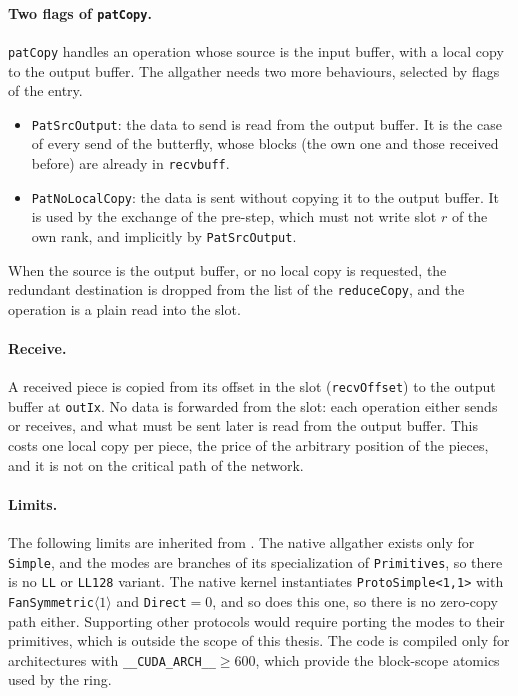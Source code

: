 \paragraph{Two flags of \texttt{patCopy}.}
\texttt{patCopy} handles an operation whose source is the input buffer, with a local copy to the output buffer.
The \bine{} allgather needs two more behaviours, selected by flags of the entry.
\begin{itemize}
  \item \texttt{PatSrcOutput}: the data to send is read from the output buffer. It is the case of every send of the butterfly, whose blocks (the own one and those received before) are already in \texttt{recvbuff}.
  \item \texttt{PatNoLocalCopy}: the data is sent without copying it to the output buffer. It is used by the exchange of the pre-step, which must not write slot $r$ of the own rank, and implicitly by \texttt{PatSrcOutput}.
\end{itemize}
When the source is the output buffer, or no local copy is requested, the redundant destination is dropped from the list of the \texttt{reduceCopy}, and the operation is a plain read into the slot.

\paragraph{Receive.}
A received piece is copied from its offset in the slot (\texttt{recvOffset}) to the output buffer at \texttt{outIx}.
No data is forwarded from the slot: each operation either sends or receives, and what must be sent later is read from the output buffer.
This costs one local copy per piece, the price of the arbitrary position of the pieces, and it is not on the critical path of the network.

\paragraph{Limits.}
The following limits are inherited from \pat{}.
The native allgather exists only for \texttt{Simple}, and the \pat{} modes are branches of its specialization of \texttt{Primitives}, so there is no \texttt{LL} or \texttt{LL128} variant.
The native kernel instantiates \texttt{ProtoSimple<1,1>} with \texttt{FanSymmetric}$\langle1\rangle$ and \texttt{Direct}$=0$, and so does this one, so there is no zero-copy path either.
Supporting other protocols would require porting the \pat{} modes to their primitives, which is outside the scope of this thesis.
The code is compiled only for architectures with \texttt{\_\_CUDA\_ARCH\_\_}$\ge600$, which provide the block-scope atomics used by the ring.

